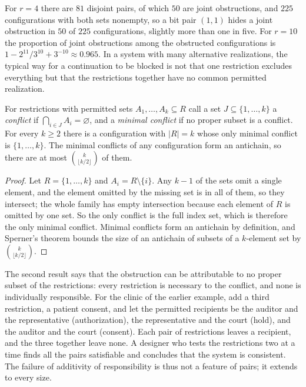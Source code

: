 For $r=4$ there are $81$ disjoint pairs, of which $50$ are joint obstructions, and $225$ configurations with both sets nonempty, so a bit pair $(1,1)$ hides a joint obstruction in $50$ of $225$ configurations, slightly more than one in five. For $r=10$ the proportion of joint obstructions among the obstructed configurations is $1-2^{11}/3^{10}+3^{-10}\approx0.965$. In a system with many alternative realizations, the typical way for a continuation to be blocked is not that one restriction excludes everything but that the restrictions together have no common permitted realization.

\begin{newresult}\label{prop:minimal-conflict}
For restrictions with permitted sets $A_1,\dots,A_k\subseteq R$ call a set $J\subseteq\{1,\dots,k\}$ a \emph{conflict} if $\bigcap_{i\in J}A_i=\varnothing$, and a \emph{minimal conflict} if no proper subset is a conflict. For every $k\ge2$ there is a configuration with $|R|=k$ whose only minimal conflict is $\{1,\dots,k\}$. The minimal conflicts of any configuration form an antichain, so there are at most $\binom{k}{\lfloor k/2\rfloor}$ of them.
\end{newresult}
\begin{proof}
Let $R=\{1,\dots,k\}$ and $A_i=R\setminus\{i\}$. Any $k-1$ of the sets omit a single element, and the element omitted by the missing set is in all of them, so they intersect; the whole family has empty intersection because each element of $R$ is omitted by one set. So the only conflict is the full index set, which is therefore the only minimal conflict. Minimal conflicts form an antichain by definition, and Sperner's theorem bounds the size of an antichain of subsets of a $k$-element set by $\binom{k}{\lfloor k/2\rfloor}$.
\end{proof}

The second result says that the obstruction can be attributable to no proper subset of the restrictions: every restriction is necessary to the conflict, and none is individually responsible. For the clinic of the earlier example, add a third restriction, a patient consent, and let the permitted recipients be the auditor and the representative (authorization), the representative and the court (hold), and the auditor and the court (consent). Each pair of restrictions leaves a recipient, and the three together leave none. A designer who tests the restrictions two at a time finds all the pairs satisfiable and concludes that the system is consistent. The failure of additivity of responsibility is thus not a feature of pairs; it extends to every size.

